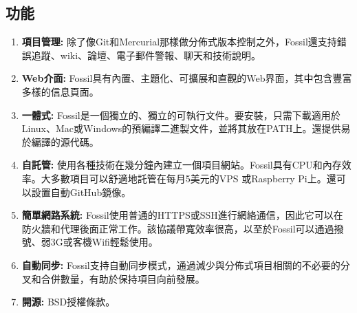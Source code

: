 \subsection{功能}
\par
\renewcommand{\baselinestretch}{1} %
\begin{enumerate}
	\item \textbf{項目管理:} 除了像Git和Mercurial那樣做分佈式版本控制之外，Fossil還支持錯誤追蹤、wiki、論壇、電子郵件警報、聊天和技術說明。
	\item \textbf{Web介面:} Fossil具有內置、主題化、可擴展和直觀的Web界面，其中包含豐富多樣的信息頁面。
	\item \textbf{一體式:} Fossil是一個獨立的、獨立的可執行文件。要安裝，只需下載適用於Linux、Mac或Windows的預編譯二進製文件，並將其放在PATH上。還提供易於編譯的源代碼。
	\item \textbf{自託管:} 使用各種技術在幾分鐘內建立一個項目網站。Fossil具有CPU和內存效率。大多數項目可以舒適地託管在每月5美元的VPS 或Raspberry Pi上。還可以設置自動GitHub鏡像。
	\item \textbf{簡單網路系統:} Fossil使用普通的HTTPS或SSH進行網絡通信，因此它可以在防火牆和代理後面正常工作。該協議帶寬效率很高，以至於Fossil可以通過撥號、弱3G或客機Wifi輕鬆使用。
	\item \textbf{自動同步:} Fossil支持自動同步模式，通過減少與分佈式項目相​​關的不必要的分叉和合併數量，有助於保持項目向前發展。
	\item \textbf{開源:} BSD授權條款。
\end{enumerate}
\par

\renewcommand{\baselinestretch}{20} %
